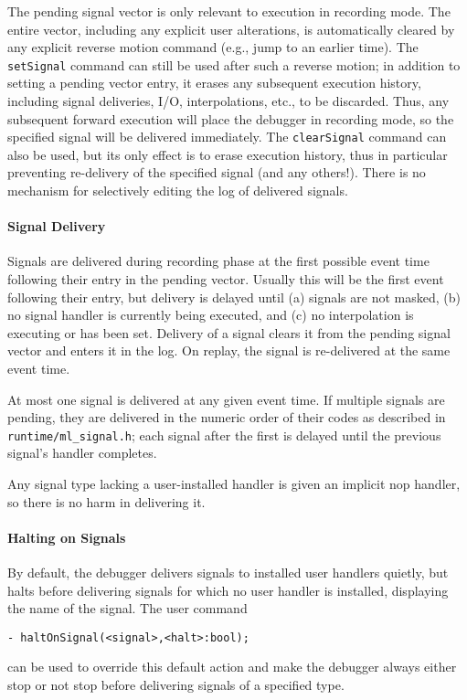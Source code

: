 The pending signal vector is only relevant to execution in recording mode.
The entire vector, including any explicit user alterations,
is automatically cleared by any explicit reverse motion command (e.g.,
jump to an earlier time).
The \verb'setSignal' command can still be used after such a reverse motion;
in addition to setting a pending vector entry, it erases any 
subsequent execution history, including signal deliveries,
I/O, interpolations, etc., to be discarded. Thus, any subsequent forward
execution will place the debugger in recording mode, so the specified
signal will be delivered immediately.  The \verb'clearSignal' command can also
be used, but its only effect is to erase execution history, thus in particular
preventing re-delivery of the specified signal (and any others!).  There
is no mechanism for selectively editing the log of delivered signals.

\paragraph{Signal Delivery}
Signals are delivered during recording phase at the first possible
event time following their entry in the pending vector. Usually this
will be the first event following their entry, but delivery is delayed until
(a) signals are not masked,
(b) no signal handler is currently being executed, and
(c) no interpolation is executing or has been set.
Delivery of a signal clears it from the pending signal vector and enters
it in the log.  On replay, the signal is re-delivered at the same 
event time.

At most one signal is delivered at any given event time. If multiple
signals are pending, they are delivered in the numeric order of their
codes as described in \verb'runtime/ml_signal.h'; each signal after the first
is delayed until the previous signal's handler completes.

Any signal type lacking a user-installed handler is given an implicit 
nop handler, so there is no harm in delivering it. 

\paragraph{Halting on Signals}
By default, the debugger delivers signals to installed user handlers
quietly, but halts before delivering signals for which 
no user handler is installed, displaying the name of the signal.
The user command
\begin{verbatim}	
- haltOnSignal(<signal>,<halt>:bool);
\end{verbatim}
can be used to override this default action and make the debugger always 
either stop or not stop before delivering signals of a specified type.

